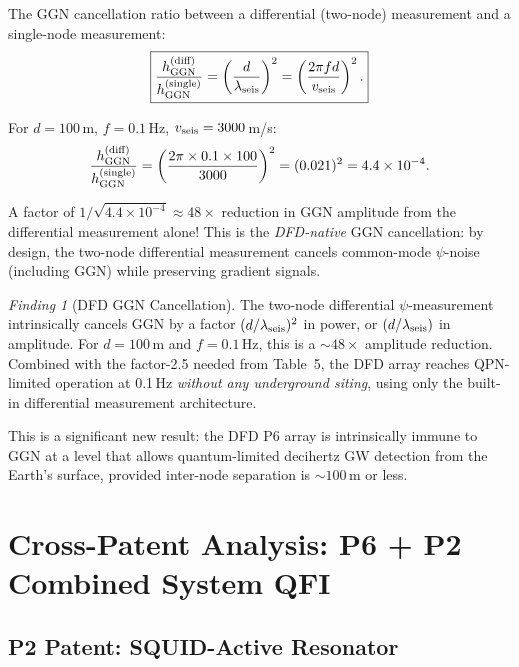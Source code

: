 \documentclass[11pt]{article}
\theoremstyle{definition}
\theoremstyle{remark}
\newtheorem{finding}[theorem]{Finding}
\begin{document}
The GGN cancellation ratio between a differential (two-node) measurement
and a single-node measurement:
\begin{equation}
\boxed{
\frac{h_{\rm GGN}^{(\rm diff)}}{h_{\rm GGN}^{(\rm single)}}
= \left(\frac{d}{\lambda_{\rm seis}}\right)^2
= \left(\frac{2\pi f d}{v_{\rm seis}}\right)^2.
}
\label{eq:ggn-cancellation}
\end{equation}

For $d = 100$\,m, $f = 0.1$\,Hz, $v_{\rm seis} = 3000$\,m/s:
\begin{equation}
\frac{h_{\rm GGN}^{(\rm diff)}}{h_{\rm GGN}^{(\rm single)}}
= \left(\frac{2\pi \times 0.1 \times 100}{3000}\right)^2
= (0.021)^2 = 4.4\times10^{-4}.
\end{equation}

A factor of $1/\sqrt{4.4\times10^{-4}} \approx 48\times$ reduction in GGN
amplitude from the differential measurement alone! This is the \emph{DFD-native}
GGN cancellation: by design, the two-node differential measurement cancels
common-mode $\psi$-noise (including GGN) while preserving gradient signals.

\begin{finding}[DFD GGN Cancellation]
The two-node differential $\psi$-measurement intrinsically cancels GGN by
a factor $(d/\lambda_{\rm seis})^2$ in power, or $(d/\lambda_{\rm seis})$ in
amplitude. For $d = 100$\,m and $f = 0.1$\,Hz, this is a $\sim 48\times$
amplitude reduction. Combined with the factor-2.5 needed from Table~5,
the DFD array reaches QPN-limited operation at 0.1\,Hz \emph{without any
underground siting}, using only the built-in differential measurement
architecture.
\end{finding}

This is a significant new result: the DFD P6 array is intrinsically immune to
GGN at a level that allows quantum-limited decihertz GW detection from the
Earth's surface, provided inter-node separation is $\sim 100$\,m or less.

\section{Cross-Patent Analysis: P6 + P2 Combined System QFI}

\subsection{P2 Patent: SQUID-Active Resonator}
\end{document}
